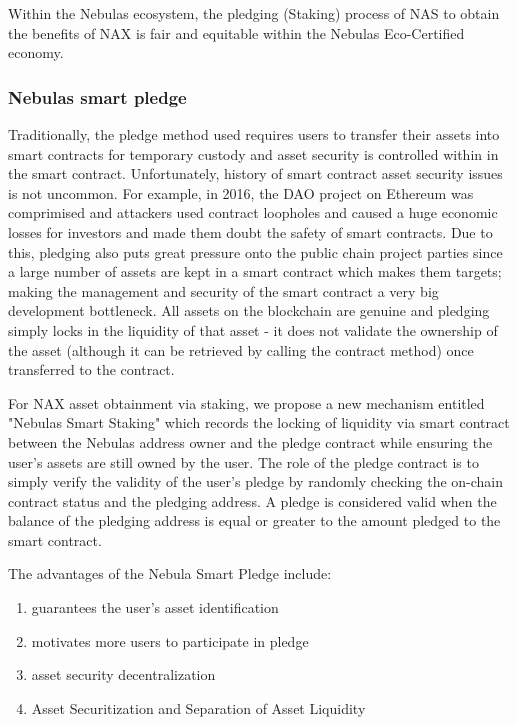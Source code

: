 Within the Nebulas ecosystem, the pledging (Staking) process of NAS to obtain the benefits of NAX is fair and equitable within the Nebulas Eco-Certified economy.

\subsubsection{Nebulas smart pledge}
Traditionally, the pledge method used requires users to transfer their assets into smart contracts for temporary custody and asset security is controlled within in the smart contract. Unfortunately, history of smart contract asset security issues is not uncommon. For example, in 2016, the DAO project on Ethereum was comprimised and attackers used contract loopholes and caused a huge economic losses for investors and made them doubt the safety of smart contracts. Due to this, pledging also puts great pressure onto the public chain project parties since a large number of assets are kept in a smart contract which makes them targets; making the management and security of the smart contract a very big development bottleneck. All assets on the blockchain are genuine and pledging simply locks in the liquidity of that asset - it does not validate the ownership of the asset (although it can be retrieved by calling the contract method) once transferred to the contract.

For NAX asset obtainment via staking, we propose a new mechanism entitled "Nebulas Smart Staking" which records the locking of liquidity via smart contract between the Nebulas address owner and the pledge contract while ensuring the user's assets are still owned by the user. The role of the pledge contract is to simply verify the validity of the user's pledge by randomly checking the on-chain contract status and the pledging address. A  pledge is considered valid when the balance of the pledging address is equal or greater to the amount pledged to the smart contract.

The advantages of the Nebula Smart Pledge include:
\begin{enumerate}[\hspace{2cm}(a)]
    \item guarantees the user's asset identification
    \item motivates more users to participate in pledge
    \item asset security decentralization
    \item Asset Securitization and Separation of Asset Liquidity
\end{enumerate}

